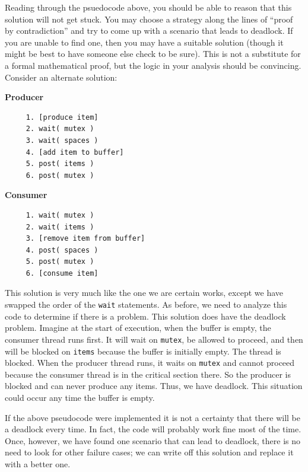 \documentclass[a4paper]{report}
\begin{document}
Reading through the psuedocode above, you should be able to reason that this solution will not get stuck. You may choose a strategy along the lines of ``proof by contradiction'' and try to come up with a scenario that leads to deadlock. If you are unable to find one, then you may have a suitable solution (though it might be best to have someone else check to be sure). This is not a substitute for a formal mathematical proof, but the logic in your analysis should be convincing. Consider an alternate solution:

\begin{multicols}{2}
	\textbf{Producer}\vspace{-2em}
	\begin{verbatim}
	 1. [produce item]
	 2. wait( mutex )
	 3. wait( spaces )
	 4. [add item to buffer]
	 5. post( items )
	 6. post( mutex )
  \end{verbatim}
	\columnbreak
	\textbf{Consumer}\vspace{-2em}
	\begin{verbatim}
	 1. wait( mutex )
	 2. wait( items )
	 3. [remove item from buffer]
	 4. post( spaces )
	 5. post( mutex )
	 6. [consume item]
  \end{verbatim}
\end{multicols}
\vspace{-2em}

This solution is very much like the one we are certain works, except we have swapped the order of the \texttt{wait} statements. As before, we need to analyze this code to determine if there is a problem. This solution does have the deadlock problem. Imagine at the start of execution, when the buffer is empty, the consumer thread runs first. It will wait on \texttt{mutex}, be allowed to proceed, and then will be blocked on \texttt{items} because the buffer is initially empty. The thread is blocked. When the producer thread runs, it waits on \texttt{mutex} and cannot proceed because the consumer thread is in the critical section there. So the producer is blocked and can never produce any items. Thus, we have deadlock. This situation could occur any time the buffer is empty.

If the above pseudocode were implemented it is not a certainty that there will be a deadlock every time. In fact, the code will probably work fine most of the time. Once, however, we have found one scenario that can lead to deadlock, there is no need to look for other failure cases; we can write off this solution and replace it with a better one.
\end{document}
